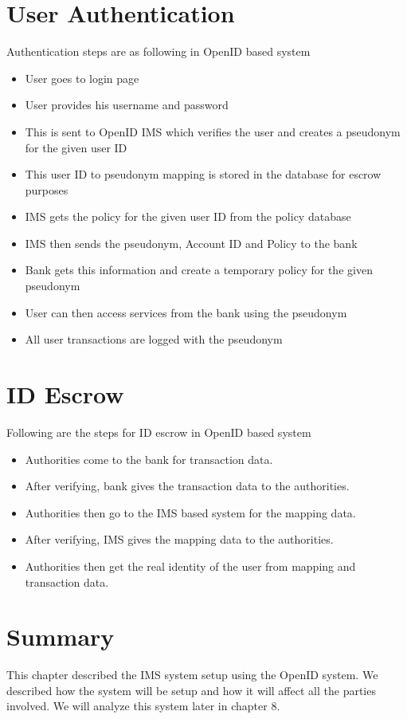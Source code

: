 \section{User Authentication}
Authentication steps are as following in OpenID based system
\begin{itemize}
	\item User goes to login page
	\item User provides his username and password
	\item This is sent to OpenID IMS which verifies the user and creates a pseudonym for the given user ID
	\item This user ID to pseudonym mapping is stored in the database for escrow purposes
	\item IMS gets the policy for the given user ID from the policy database
	\item IMS then sends the pseudonym, Account ID and Policy to the bank 
	\item Bank gets this information and create a temporary policy for the given pseudonym
	\item User can then access services from the bank using the pseudonym
	\item All user transactions are logged with the pseudonym
\end{itemize}
\section{ID Escrow}
Following are the steps for ID escrow in OpenID based system
\begin{itemize}
	\item Authorities come to the bank for transaction data.
	\item After verifying, bank gives the transaction data to the authorities.
	\item Authorities then go to the IMS based system for the mapping data.
	\item After verifying, IMS gives the mapping data to the authorities.
	\item Authorities then get the real identity of the user from mapping and transaction data.
\end{itemize}
\section{Summary}
This chapter described the IMS system setup using the OpenID system. We described how the system will be setup and how it will affect all the parties involved. We will analyze this system later in chapter 8.

